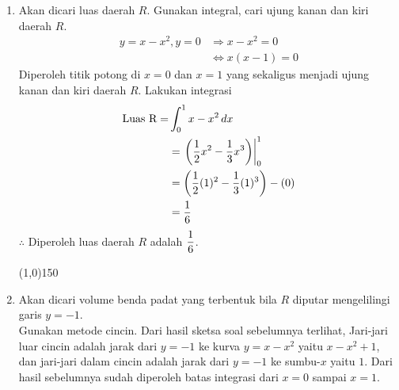 \begin{enumerate}[leftmargin=*, label={\arabic*}.]
\begin{enumerate}[label={\alph*}.]
    \item Akan dicari luas daerah $R$.
    Gunakan integral, cari ujung kanan dan kiri daerah $R$.
    \begin{align*}
        y=x-x^{2}, y=0 &\Longrightarrow x-x^{2}=0\\
        &\iff x(x-1) = 0
    \end{align*}
    Diperoleh titik potong di $x=0$ dan $x=1$ yang sekaligus menjadi ujung kanan 
    dan kiri daerah $R$. Lakukan integrasi
    \begin{align*}
        \text{Luas R} = &\int_{0}^{1} x-x^{2}\,dx\\
        &=\eval{\frac{1}{2}x^{2}-\frac{1}{3}x^{3}}{0}{1}\\
        &=\brk*{\frac{1}{2}(1)^{2}-\frac{1}{3}(1)^{3}}-(0)\\
        &=\frac{1}{6}
    \end{align*}
    $\therefore$ Diperoleh luas daerah $R$ adalah $\ds\frac{1}{6}$.
\begin{center}
    \line(1,0){150}
\end{center}
    \item Akan dicari volume benda padat yang terbentuk bila $R$ diputar 
    mengelilingi garis $y=-1$.\\
    Gunakan metode cincin. Dari hasil sketsa soal sebelumnya terlihat, Jari-jari luar 
    cincin adalah jarak dari $y=-1$ ke kurva $y=x-x^{2}$ yaitu $x-x^{2}+1$, dan 
    jari-jari dalam cincin adalah jarak dari $y=-1$ ke sumbu-$x$ yaitu $1$. Dari hasil 
    sebelumnya sudah diperoleh batas integrasi dari $x=0$ sampai $x=1$.


\end{enumerate}
\end{enumerate}
